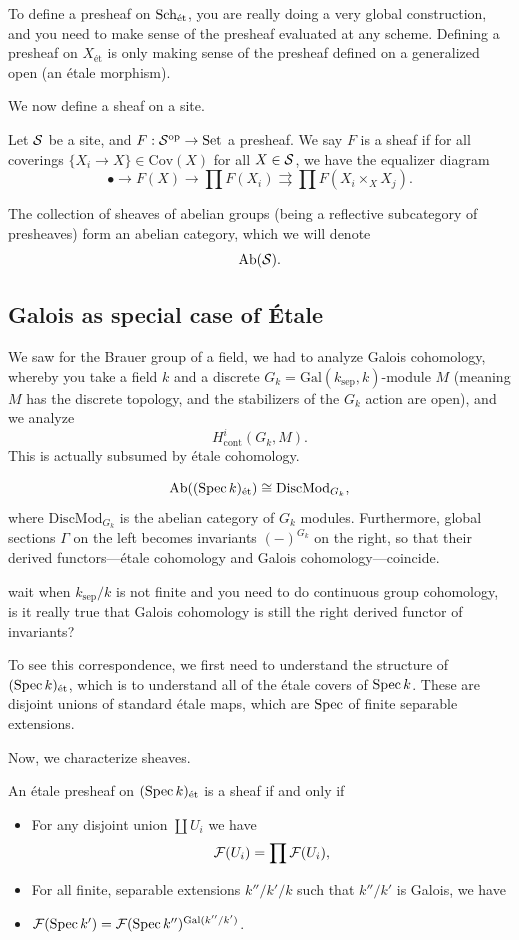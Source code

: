 \documentclass[12pt]{article}
\newcommand{\et}{\text{\'{e}t}}
\newcommand{\sep}{\text{sep}}
\newcommand{\Gal}{\mathrm{Gal}}
\newcommand{\Cov}{\mathrm{Cov}}
\newcommand{\Ab}{\mathrm{Ab}}
\newcommand{\DiscMod}{\mathrm{DiscMod}}
\begin{document}
To define a presheaf on $\Sch_\et$, you are really doing a very global construction, and you need to make sense of the presheaf evaluated at any scheme. Defining a presheaf on $X_\et$ is only making sense of the presheaf defined on a generalized open (an \'etale morphism).

We now define a sheaf on a site.

\begin{defn}
    Let $\mathcal{S}$ be a site, and $F: \mathcal{S}^{\mathrm{op}} \to \mathrm{Set}$ a presheaf. We say $F$ is a sheaf if for all coverings $\{X_i\to X\} \in \Cov(X)$ for all $X\in \mathcal{S}$, we have the equalizer diagram
    \[\bullet \to F(X) \to \prod F(X_i) \rightrightarrows \prod F(X_i \times_X X_j).\]
\end{defn}

The collection of sheaves of abelian groups (being a reflective subcategory of presheaves) form an abelian category, which we will denote
\[\Ab(\cS).\]


\subsection{Galois as special case of \'Etale}

We saw for the Brauer group of a field, we had to analyze Galois cohomology, whereby you take a field $k$ and a discrete $G_k=\Gal(k_\sep,k)$-module $M$ (meaning $M$ has the discrete topology, and the stabilizers of the $G_k$ action are open), and we analyze
\[H_{\text{cont}}^i(G_k,M).\]
This is actually subsumed by \'etale cohomology.

\begin{prop}
    \[\Ab((\Spec k)_\et) \cong \DiscMod_{G_k},\]
    where $\DiscMod_{G_k}$ is the abelian category of $G_k$ modules. Furthermore, global sections $\Gamma$ on the left becomes invariants $(-)^{G_k}$ on the right, so that their derived functors---\'etale cohomology and Galois cohomology---coincide.
\end{prop}

{\color{red} wait when $k_\sep/k$ is not finite and you need to do continuous group cohomology, is it really true that Galois cohomology is still the right derived functor of invariants?}

To see this correspondence, we first need to understand the structure of $(\Spec k)_\et$, which is to understand all of the \'etale covers of $\operatorname{Spec} k$. These are disjoint unions of standard \'etale maps, which are $\operatorname{Spec}$ of finite separable extensions.

Now, we characterize sheaves.
\begin{lem}
    An \'etale presheaf on $(\Spec k)_\et$ is a sheaf if and only if
    \begin{itemize}
        \item For any disjoint union $\coprod U_i$ we have
        \[\mathcal{F}(U_i) = \prod \mathcal{F}(U_i),\]
        \item For all finite, separable extensions $k''/k'/k$ such that $k''/k'$ is Galois, we have
        \item $\cF(\Spec k') = \cF(\Spec k'')^{\Gal(k''/k')}$.
    \end{itemize}
\end{lem}
\end{document}
